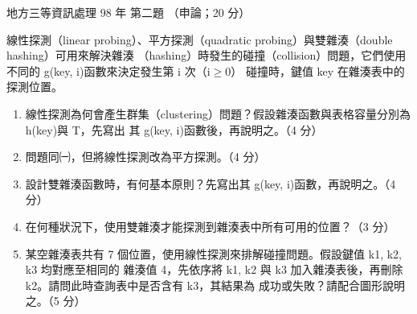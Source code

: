 \begin{pastexam}[label={px:df3-098-ds-02}]{地方三等資訊處理 98 年 第二題}
（申論；20 分）

線性探測（linear probing）、平方探測（quadratic probing）與雙雜湊（double hashing）可用來解決雜湊
（hashing）時發生的碰撞（collision）問題，它們使用不同的 g(key, i)函數來決定發生第 i 次（i$\geq$0）
碰撞時，鍵值 key 在雜湊表中的探測位置。
\begin{enumerate}[leftmargin=2.2em]
\item[㈠] 線性探測為何會產生群集（clustering）問題？假設雜湊函數與表格容量分別為 h(key)與 T，先寫出
其 g(key, i)函數後，再說明之。（4 分）
\item[㈡] 問題同㈠，但將線性探測改為平方探測。（4 分）
\item[㈢] 設計雙雜湊函數時，有何基本原則？先寫出其 g(key, i)函數，再說明之。（4 分）
\item[㈣] 在何種狀況下，使用雙雜湊才能探測到雜湊表中所有可用的位置？（3 分）
\item[㈤] 某空雜湊表共有 7 個位置，使用線性探測來排解碰撞問題。假設鍵值 k1, k2, k3 均對應至相同的
雜湊值 4，先依序將 k1, k2 與 k3 加入雜湊表後，再刪除 k2。請問此時查詢表中是否含有 k3，其結果為
成功或失敗？請配合圖形說明之。（5 分）
\end{enumerate}
\end{pastexam}

